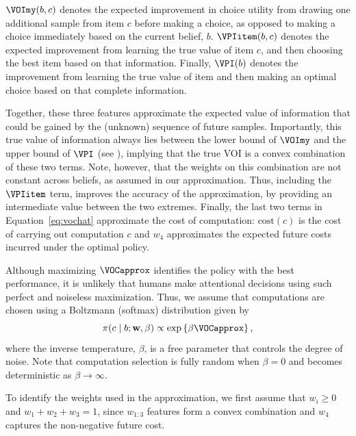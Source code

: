 $\VOImy(b,c)$ denotes the expected improvement in choice utility from drawing one additional sample from item $c$ before making a choice, as opposed to making a choice immediately based on the current belief, $b$. $\VPIitem(b,c)$ denotes the expected improvement from learning the true value of item $c$, and then choosing the best item based on that information. Finally, $\VPI(b)$ denotes the improvement from learning the true value of  item and then making an optimal choice based on that complete information.

Together, these three features approximate the expected value of information that could be gained by the (unknown) sequence of future samples. Importantly, this true value of information always lies between the lower bound of $\VOImy$ and the upper bound of $\VPI$ (see ), implying that the true VOI is a convex combination of these two terms. Note, however, that the weights on this combination are not constant across beliefs, as assumed in our approximation. Thus, including the $\VPIitem$ term, improves the accuracy of the approximation, by providing an intermediate value between the two extremes. Finally, the last two terms in Equation~\ref{eq:vochat} approximate the cost of computation: $\text{cost}(c)$ is the cost of carrying out computation $c$ and $w_{4}$ approximates the expected future costs incurred under the optimal policy.

Although maximizing $\VOCapprox$ identifies the policy with the best performance, it is unlikely that humans make attentional decisions using such perfect and noiseless maximization. Thus, 
we assume that computations are chosen using a Boltzmann (softmax) distribution   \citep{mcfadden2001economic} given  by
\[
\pi(c \mid b; \mathbf{w}, \beta) \propto \exp \left\{ \beta\VOCapprox \right\},
\]
where the inverse temperature, $\beta$, is a free parameter that controls the degree of noise. Note that computation selection is fully random when $\beta=0$ and becomes deterministic as $\beta\rightarrow\infty$.



To identify the weights used in the approximation, we first assume that $w_{i}\ge0$ and $w_{1}+w_{2}+w_{3}=1$, since $w_{1:3}$ features form a convex combination and $w_4$ captures the non-negative future cost.